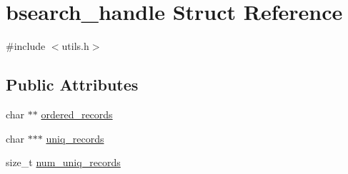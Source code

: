 \hypertarget{structbsearch__handle}{\section{bsearch\-\_\-handle \-Struct \-Reference}
\label{structbsearch__handle}
}


{\ttfamily \#include $<$utils.\-h$>$}

\subsection*{\-Public \-Attributes}
\begin{DoxyCompactItemize}
\item 
char $\ast$$\ast$ \hyperlink{structbsearch__handle_afc72b1ba737f8fbd876df833d366aa0a}{ordered\-\_\-records}
\item 
char $\ast$$\ast$$\ast$ \hyperlink{structbsearch__handle_a57b7985cee8d7b2ae2dfe70fdfd0da01}{uniq\-\_\-records}
\item 
size\-\_\-t \hyperlink{structbsearch__handle_ad71c165b2020a4040e89947e38646a05}{num\-\_\-uniq\-\_\-records}
\end{DoxyCompactItemize}


